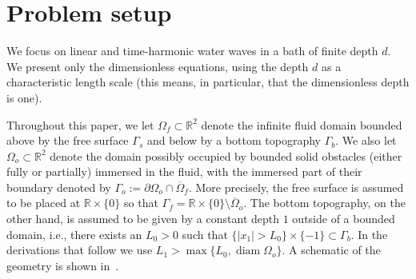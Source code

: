 \documentclass[review,hidelinks,onefignum,onetabnum]{siamart220329}
\newcommand{\R}{\mathbb{R}}
\begin{document}





\section{Problem setup}\label{sec:prob_setup}

We focus on linear and time-harmonic water waves in a bath of finite depth $d$. We present only the dimensionless equations, using the depth $d$ as a characteristic length scale (this means, in particular, that the dimensionless depth is one). 

Throughout this paper, we let $\Omega_f \subset \mathbb{R}^2$ denote the infinite fluid domain bounded above by the free surface $\Gamma_s$ and below by a bottom topography $\Gamma_b$. We also let $\Omega_o \subset \mathbb{R}^2$
denote the domain possibly occupied by bounded solid obstacles (either fully or partially) immersed in the fluid, with the immersed part of their boundary denoted by $\Gamma_o:=\partial \Omega_o\cap\overline\Omega_f$. More precisely, the free surface is assumed to be placed at $\R\times\{0\}$ so that $\Gamma_f = \R \times \{0\} \setminus
\overline\Omega_o$.  The bottom topography, on the other hand, is assumed to be given by a constant depth $1$ outside of a bounded domain, i.e., there exists an $L_0>0$ such that $\{|x_1|>L_0\}\times \{-1\}\subset\Gamma_b$. In the derivations that follow we use $L_1>\max\{L_0,\operatorname{diam}\Omega_o\}$. %
A schematic of the geometry is shown in~.
\end{document}
